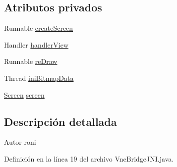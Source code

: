 \subsection*{Atributos privados}
\begin{DoxyCompactItemize}
\item 
Runnable \hyperlink{classes_1_1ucm_1_1tfg_1_1controlremotolinux_1_1client_1_1model_1_1VncBridgeJNI_a8d14c9f9241ecdb40672f8c76bdb7834}{create\-Screen}
\item 
Handler \hyperlink{classes_1_1ucm_1_1tfg_1_1controlremotolinux_1_1client_1_1model_1_1VncBridgeJNI_a456b567b0009e30048be76ccfbedcd0b}{handler\-View}
\item 
Runnable \hyperlink{classes_1_1ucm_1_1tfg_1_1controlremotolinux_1_1client_1_1model_1_1VncBridgeJNI_a69b941469d487a4e6e7ebd83a9091b26}{re\-Draw}
\item 
Thread \hyperlink{classes_1_1ucm_1_1tfg_1_1controlremotolinux_1_1client_1_1model_1_1VncBridgeJNI_ac4fac9c5083bbd152bebfa5b3c68baf5}{ini\-Bitmap\-Data}
\item 
\hyperlink{classes_1_1ucm_1_1tfg_1_1controlremotolinux_1_1client_1_1model_1_1Screen}{Screen} \hyperlink{classes_1_1ucm_1_1tfg_1_1controlremotolinux_1_1client_1_1model_1_1VncBridgeJNI_a4bd641b0970fbe3d8687049f7f65a36b}{screen}
\end{DoxyCompactItemize}


\subsection{Descripción detallada}
\begin{DoxyAuthor}{Autor}
roni 
\end{DoxyAuthor}


Definición en la línea 19 del archivo Vnc\-Bridge\-J\-N\-I.\-java.



